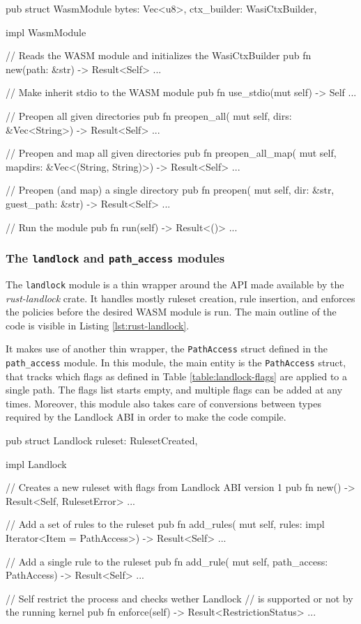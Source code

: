 \begin{code}[language=Rust, caption=The outline of the \texttt{wasm} module]
pub struct WasmModule {
  bytes: Vec<u8>, ctx_builder: WasiCtxBuilder,
}

impl WasmModule {
  // Reads the WASM module and initializes the WasiCtxBuilder
  pub fn new(path: &str) -> Result<Self> { ... }

  // Make inherit stdio to the WASM module
  pub fn use_stdio(mut self) -> Self { ... }

  // Preopen all given directories
  pub fn preopen_all(
    mut self,
    dirs: &Vec<String>) -> Result<Self> {...}

  // Preopen and map all given directories
  pub fn preopen_all_map(
    mut self,
    mapdirs: &Vec<(String, String)>) -> Result<Self> {...}

  // Preopen (and map) a single directory
  pub fn preopen(
    mut self,
    dir: &str, guest_path: &str) -> Result<Self> {...}

  // Run the module
  pub fn run(self) -> Result<()> {...}
}  
\end{code}

\subsubsection{The \texttt{landlock} and \texttt{path\_access} modules}

The \texttt{landlock} module is a thin wrapper around the API made available by the \textit{rust-landlock} crate.
It handles mostly ruleset creation, rule insertion, and enforces the policies before the desired WASM module is run.
The main outline of the code is visible in Listing \ref{lst:rust-landlock}.

It makes use of another thin wrapper, the \texttt{PathAccess} struct defined in the \texttt{path\_access} module.
In this module, the main entity is the \texttt{PathAccess} struct, that tracks which flags as defined in Table \ref{table:landlock-flags}
are applied to a single path. The flags list starts empty, and multiple flags can be added at any times.
Moreover, this module also takes care of conversions between types required by the Landlock ABI in order
to make the code compile.

\begin{code}[language=Rust, caption=The outline of the \texttt{landlock} module, label=lst:rust-landlock]
pub struct Landlock {
  ruleset: RulesetCreated,
}

impl Landlock {
  // Creates a new ruleset with flags from Landlock ABI version 1
  pub fn new() -> Result<Self, RulesetError> { ... }

  // Add a set of rules to the ruleset
  pub fn add_rules(
    mut self,
    rules: impl Iterator<Item = PathAccess>) -> Result<Self>
  { ... }

  // Add a single rule to the ruleset
  pub fn add_rule(
    mut self,
    path_access: PathAccess) -> Result<Self>
  { ... }

  // Self restrict the process and checks wether Landlock
  // is supported or not by the running kernel
  pub fn enforce(self) -> Result<RestrictionStatus> { ... }
}
\end{code}

